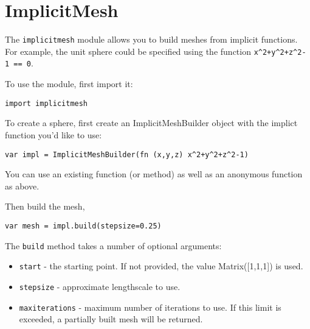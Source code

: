 \hypertarget{implicitmesh}{%
\section{ImplicitMesh}\label{implicitmesh}}

The \texttt{implicitmesh} module allows you to build meshes from
implicit functions. For example, the unit sphere could be specified
using the function \texttt{x\^{}2+y\^{}2+z\^{}2-1\ ==\ 0}.

To use the module, first import it:

\begin{lstlisting}
import implicitmesh
\end{lstlisting}

To create a sphere, first create an ImplicitMeshBuilder object with the
implict function you'd like to use:

\begin{lstlisting}
var impl = ImplicitMeshBuilder(fn (x,y,z) x^2+y^2+z^2-1)
\end{lstlisting}

You can use an existing function (or method) as well as an anonymous
function as above.

Then build the mesh,

\begin{lstlisting}
var mesh = impl.build(stepsize=0.25)
\end{lstlisting}

The \texttt{build} method takes a number of optional arguments:

\begin{itemize}

\item
  \texttt{start} - the starting point. If not provided, the value
  Matrix({[}1,1,1{]}) is used.
\item
  \texttt{stepsize} - approximate lengthscale to use.
\item
  \texttt{maxiterations} - maximum number of iterations to use. If this
  limit is exceeded, a partially built mesh will be returned.
\end{itemize}
